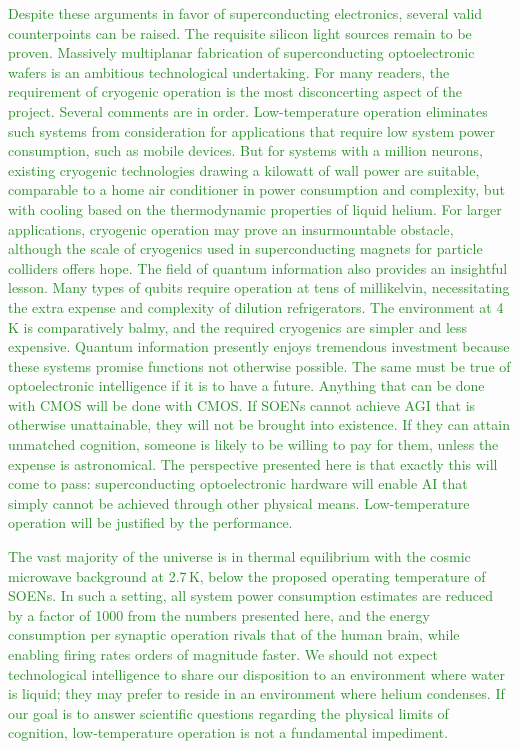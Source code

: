 \documentclass[twocolumn]{article}
\begin{document}
\textcolor{ForestGreen}{Despite these arguments in favor of superconducting electronics, several valid counterpoints can be raised. The requisite silicon light sources remain to be proven. Massively multiplanar fabrication of superconducting optoelectronic wafers is an ambitious technological undertaking. For many readers, the requirement of cryogenic operation is the most disconcerting aspect of the project. Several comments are in order. Low-temperature operation eliminates such systems from consideration for applications that require low system power consumption, such as mobile devices. But for systems with a million neurons, existing cryogenic technologies drawing a kilowatt of wall power are suitable, comparable to a home air conditioner in power consumption and complexity, but with cooling based on the thermodynamic properties of liquid helium. For larger applications, cryogenic operation may prove an insurmountable obstacle, although the scale of cryogenics used in superconducting magnets for particle colliders offers hope. The field of quantum information also provides an insightful lesson. Many types of qubits require operation at tens of millikelvin, necessitating the extra expense and complexity of dilution refrigerators. The environment at 4\,K is comparatively balmy, and the required cryogenics are simpler and less expensive. Quantum information presently enjoys tremendous investment because these systems promise functions not otherwise possible. The same must be true of optoelectronic intelligence if it is to have a future. Anything that can be done with CMOS will be done with CMOS. If SOENs cannot achieve AGI that is otherwise unattainable, they will not be brought into existence. If they can attain unmatched cognition, someone is likely to be willing to pay for them, unless the expense is astronomical. The perspective presented here is that exactly this will come to pass: superconducting optoelectronic hardware will enable AI that simply cannot be achieved through other physical means. Low-temperature operation will be justified by the performance.}

\textcolor{ForestGreen}{The vast majority of the universe is in thermal equilibrium with the cosmic microwave background at 2.7\,K, below the proposed operating temperature of SOENs. In such a setting, all system power consumption estimates are reduced by a factor of 1000 from the numbers presented here, and the energy consumption per synaptic operation rivals that of the human brain, while enabling firing rates orders of magnitude faster. We should not expect technological intelligence to share our disposition to an environment where water is liquid; they may prefer to reside in an environment where helium condenses. If our goal is to answer scientific questions regarding the physical limits of cognition, low-temperature operation is not a fundamental impediment.}
\end{document}
